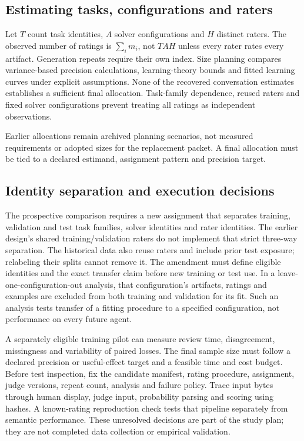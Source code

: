 \subsection{Estimating tasks, configurations and raters}
Let $T$ count task identities, $A$ solver configurations and $H$ distinct raters.
The observed number of ratings is $\sum_i m_i$, not $TAH$ unless every rater rates every artifact.
Generation repeats require their own index.
Size planning compares variance-based precision calculations, learning-theory bounds and fitted learning curves under explicit assumptions.
None of the recovered conversation estimates establishes a sufficient final allocation.
Task-family dependence, reused raters and fixed solver configurations prevent treating all ratings as independent observations.

Earlier allocations remain archived planning scenarios, not measured requirements or adopted sizes for the replacement packet.
A final allocation must be tied to a declared estimand, assignment pattern and precision target.

\subsection{Identity separation and execution decisions}
The prospective comparison requires a new assignment that separates training, validation and test task families, solver identities and rater identities.
The earlier design's shared training/validation raters do not implement that strict three-way separation.
The historical data also reuse raters and include prior test exposure; relabeling their splits cannot remove it.
The amendment must define eligible identities and the exact transfer claim before new training or test use.
In a leave-one-configuration-out analysis, that configuration's artifacts, ratings and examples are excluded from both training and validation for its fit.
Such an analysis tests transfer of a fitting procedure to a specified configuration, not performance on every future agent.

A separately eligible training pilot can measure review time, disagreement, missingness and variability of paired losses.
The final sample size must follow a declared precision or useful-effect target and a feasible time and cost budget.
Before test inspection, fix the candidate manifest, rating procedure, assignment, judge versions, repeat count, analysis and failure policy.
Trace input bytes through human display, judge input, probability parsing and scoring using hashes.
A known-rating reproduction check tests that pipeline separately from semantic performance.
These unresolved decisions are part of the study plan; they are not completed data collection or empirical validation.
